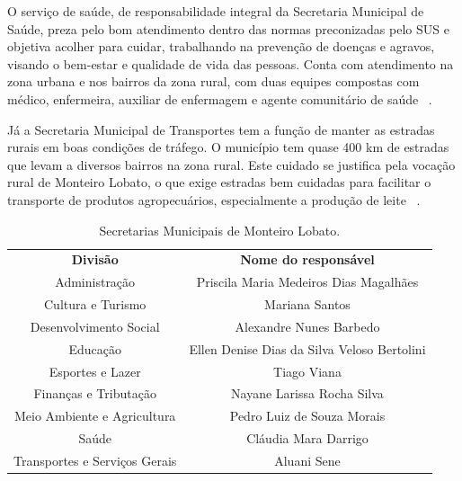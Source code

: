 O serviço de saúde, de responsabilidade integral da Secretaria Municipal de Saúde, preza pelo bom atendimento dentro das normas preconizadas pelo SUS e objetiva acolher para cuidar, trabalhando na prevenção de doenças e agravos, visando o bem-estar e qualidade de vida das pessoas. Conta com atendimento na zona urbana e nos bairros da zona rural, com duas equipes compostas com médico, enfermeira, auxiliar de enfermagem e agente comunitário de saúde ~\cite{MonteiroLobatoSite}.

Já a Secretaria Municipal de Transportes tem a função de manter as estradas rurais em boas condições de tráfego. O município tem quase 400 km de estradas que levam a diversos bairros na zona rural. Este cuidado se justifica pela vocação rural de Monteiro Lobato, o que exige estradas bem cuidadas para facilitar o transporte de produtos agropecuários, especialmente a produção de leite ~\cite{MonteiroLobatoSite}.

%	

\begin{table}[htbp]
	\centering
	\caption{Secretarias Municipais de Monteiro Lobato.}
	\begin{tabular}{c|c}
		\rowcolor[rgb]{ .969,  .588,  .275} \textcolor[rgb]{ 1,  1,  1}{\textbf{Divisão}} & \textcolor[rgb]{ 1,  1,  1}{\textbf{Nome do responsável}} \\
		\rowcolor[rgb]{ .992,  .914,  .851} Administração & Priscila Maria Medeiros Dias Magalhães \\
		\rowcolor[rgb]{ .984,  .831,  .706} Cultura e Turismo & Mariana Santos \\
		\rowcolor[rgb]{ .992,  .914,  .851} Desenvolvimento Social & Alexandre Nunes Barbedo \\
		\rowcolor[rgb]{ .984,  .831,  .706} Educação & Ellen Denise Dias da Silva Veloso Bertolini \\
		\rowcolor[rgb]{ .992,  .914,  .851} Esportes e Lazer & Tiago Viana \\
		\rowcolor[rgb]{ .984,  .831,  .706} Finanças e Tributação & Nayane Larissa Rocha Silva \\
		\rowcolor[rgb]{ .992,  .914,  .851} Meio Ambiente e Agricultura & Pedro Luiz de Souza Morais \\
		\rowcolor[rgb]{ .984,  .831,  .706} Saúde & Cláudia Mara Darrigo \\
		\rowcolor[rgb]{ .992,  .914,  .851} Transportes e Serviços Gerais & Aluani Sene \\
	\end{tabular}%
	\label{tab:secretarias}%
\end{table}%


